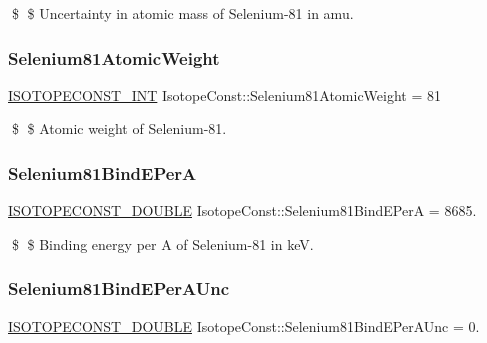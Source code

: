 \$ \$ Uncertainty in atomic mass of Selenium-\/81 in amu. \mbox{\label{group___isotope_const-_selenium-_se81_gad16be2af0d2701851cf39afb9c05e55d}} 
\subsubsection{\texorpdfstring{Selenium81\+Atomic\+Weight}{Selenium81AtomicWeight}}
{\footnotesize\ttfamily \mbox{\hyperlink{group___isotope_const-_macros_ga5f18360b3e99483a35c32d789e62621c}{I\+S\+O\+T\+O\+P\+E\+C\+O\+N\+S\+T\+\_\+\+I\+NT}} Isotope\+Const\+::\+Selenium81\+Atomic\+Weight = 81}

\$ \$ Atomic weight of Selenium-\/81. \mbox{\label{group___isotope_const-_selenium-_se81_ga20f6f1a65571409461471ad23e7c7956}} 
\subsubsection{\texorpdfstring{Selenium81\+Bind\+E\+PerA}{Selenium81BindEPerA}}
{\footnotesize\ttfamily \mbox{\hyperlink{group___isotope_const-_macros_ga8f45a7272ce02c0b4c65c44636ed719a}{I\+S\+O\+T\+O\+P\+E\+C\+O\+N\+S\+T\+\_\+\+D\+O\+U\+B\+LE}} Isotope\+Const\+::\+Selenium81\+Bind\+E\+PerA = 8685.}

\$ \$ Binding energy per A of Selenium-\/81 in keV. \mbox{\label{group___isotope_const-_selenium-_se81_ga60a1873458cbda77e3e1a6fc384feabe}} 
\subsubsection{\texorpdfstring{Selenium81\+Bind\+E\+Per\+A\+Unc}{Selenium81BindEPerAUnc}}
{\footnotesize\ttfamily \mbox{\hyperlink{group___isotope_const-_macros_ga8f45a7272ce02c0b4c65c44636ed719a}{I\+S\+O\+T\+O\+P\+E\+C\+O\+N\+S\+T\+\_\+\+D\+O\+U\+B\+LE}} Isotope\+Const\+::\+Selenium81\+Bind\+E\+Per\+A\+Unc = 0.}

